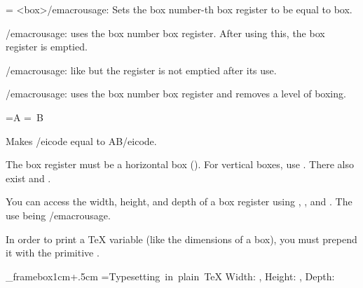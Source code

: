 {{    \textbox\empty{4cm}{\lastoy}{\hsize-5cm}{}
        \macrousage{} = <box>/emacrousage: Sets the {\fifteentt box number}-th box register to be equal to
        {\fifteentt box}.
    \endtextbox

    \textbox{}
        \centerline{\color{white}\macroname\box}
    \endtextbox

    \textbox\empty{4cm}{\lastoy}{\hsize-5cm}{}
        \macrousage{}/emacrousage: uses the {\fifteentt box number} box register.
        After using this, the box register is emptied.
    \endtextbox

    \textbox{}
        \centerline{\color{white}\macroname\copy}
    \endtextbox

    \textbox\empty{4cm}{\lastoy}{\hsize-5cm}{}
        \macrousage{}/emacrousage: like \macroname\box{} but the register is not emptied after its use.
    \endtextbox

    \textbox{}
        \centerline{\color{white}\macroname\unhbox}
    \endtextbox

    \textbox\empty{4cm}{\lastoy}{\hsize-5cm}{}
        \macrousage{}/emacrousage: uses the {\fifteentt box number} box register and removes a level of boxing.

\beginhi
{}=\hbox{A} =\hbox{ B}
\endhi

        Makes \icode {}/eicode{} equal to \icode \hbox{AB}/eicode.

        The box register must be a horizontal box (\macroname\hbox).
        For vertical boxes, use \macroname\unvbox.
        There also exist \macroname\unhcopy{} and \macroname\unvcopy.
    \endtextbox

\endslide

\beginslide
    \bheadline

    \textbox\empty{1cm}{2cm}{\hsize-2cm}{}
        You can access the width, height, and depth of a box register using \macroname\wd, \macroname\ht, and \macroname\dp.
        The use being \macrousage {}/emacrousage.

        In order to print a \TeX{} variable (like the dimensions of a box), you must prepend it with the primitive \macroname\the.
    \endtextbox

    \textbox\_framebox{1cm}{\lastey+.5cm}{\hsize-2cm}{}
\beginhi
{}=\hbox{Typesetting in plain \TeX}
Width: \the{}, Height: \the{}, Depth: \the{}
\endhi
    \endtextbox

}}
